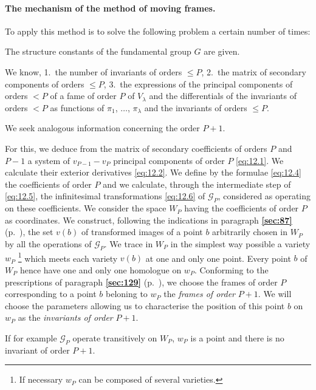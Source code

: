 \documentclass[leqno,11pt]{book}
\numberwithin{equation}{chapter}
\theoremstyle{shape1}
\theoremstyle{shapesmall}
\newcommand{\fsref}[1]{{\rm\textsection\textbf{\ref{sec:#1}}}}
\newcommand{\somespace}{\vspace{9pt}}
\begin{document}
\paragraph{The mechanism of the method of moving frames.}
\label{sec:172}
To apply this method is to solve the following problem a certain number of times:

\somespace

The structure constants of the fundamental group $G$ are given.

We know, 1.~the number of invariants of orders $\le P$, 2.~the matrix of secondary components of orders $\le P$, 3.~the expressions of the principal components of orders $<P$ of a fame of order $P$ of $V_{\lambda}$ and the differentials of the invariants of orders $<P$ as functions of $\pi_{1}$, $\dots$, $\pi_{\lambda}$ and the invariants of orders $\le P$.

We seek analogous information concerning the order $P+1$.

\somespace

For this, we deduce from the matrix of secondary coefficients of orders $P$ and $P-1$ a system of $v_{P-1}-v_{P}$ principal components of order $P$ \eqref{eq:12.1}. We calculate their exterior derivatives \eqref{eq:12.2}. We define by the formulae \eqref{eq:12.4} the coefficients of order $P$ and we calculate, through the intermediate step of \eqref{eq:12.5}, the infinitesimal transformations \eqref{eq:12.6} of $\mathcal{G}_{P}$, considered as operating on these coefficients. We consider the space $W_{P}$ having the coefficients of order $P$ as coordinates. We construct, following the indications in paragraph \fsref{87} (p.~\pageref{sec:87}), the set $v(b)$ of transformed images of a point $b$ arbitrarily chosen in $W_{P}$ by all the operations of $\mathcal{G}_{P}$. We trace in $W_{P}$ in the simplest way possible a variety $w_{P}$ \footnote{If necessary $w_{P}$ can be composed of several varieties.} which meets each variety $v(b)$ at one and only one point. Every point $b$ of $W_{P}$ hence have one and only one homologue on $w_{P}$. Conforming to the prescriptions of paragraph \fsref{129} (p.~\pageref{sec:129}), we choose the frames of order $P$ corresponding to a point $b$ beloning to $w_{P}$ the \emph{frames of order} $P+1$. We will choose the parameters allowing us to characterise the position of this point $b$ on $w_{P}$ as the \emph{invariants of order} $P+1$.

\somespace

{\small
If for example $\mathcal{G}_{P}$ operate transitively on $W_{P}$, $w_{P}$ is a point and there is no invariant of order $P+1$.
}
\end{document}

